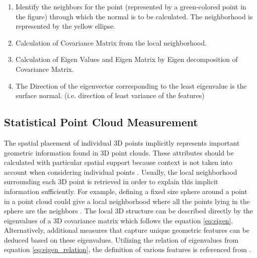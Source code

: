 \begin{enumerate}
    \item Identify the neighbors for the point (represented by a green-colored point in the figure) through which the normal is to be calculated. The neighborhood is represented by the yellow ellipse. 
    \item Calculation of Covariance Matrix from the local neighborhood.
    \item Calculation of Eigen Values and Eigen Matrix by Eigen decomposition of Covariance Matrix.
    \item The Direction of the eigenvector corresponding to the least eigenvalue is the surface normal. (i.e. direction of least variance of the features)
\end{enumerate}

\subsection{Statistical Point Cloud Measurement}
The spatial placement of individual 3D points implicitly represents important geometric information found in 3D point clouds. These attributes should be calculated with particular spatial support because context is not taken into account when considering individual points \parencite{weinmann2013feature}. Usually, the local neighborhood surrounding each 3D point is retrieved in order to explain this implicit information sufficiently. For example, defining a fixed size sphere around a point in a point cloud could give a local neighborhood where all the points lying in the sphere are the neighbors \parencite{lee2002perceptual}. The local 3D structure can be described directly by the eigenvalues of a 3D covariance matrix which follows the equation \ref{eq:eigen}. Alternatively, additional measures that capture unique geometric features can be deduced based on these eigenvalues. Utilizing the relation of eigenvalues from equation \ref{eq:eigen_relation}, the definition of various features is referenced from \parencite{weinmann2013feature}.

